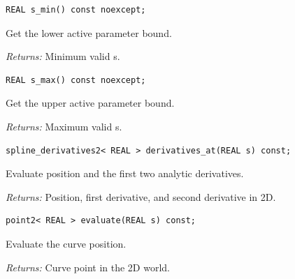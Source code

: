 \par\noindent\begin{minipage}{\linewidth}
\begin{lstlisting}[style=apireference]
REAL s_min() const noexcept;
\end{lstlisting}
{\footnotesize Get the lower active parameter bound.\par}
{\footnotesize\textit{Returns:} Minimum valid s.\par}
\end{minipage}\par\vspace{1pt}
\par\noindent\begin{minipage}{\linewidth}
\begin{lstlisting}[style=apireference]
REAL s_max() const noexcept;
\end{lstlisting}
{\footnotesize Get the upper active parameter bound.\par}
{\footnotesize\textit{Returns:} Maximum valid s.\par}
\end{minipage}\par\vspace{1pt}
\par\noindent\begin{minipage}{\linewidth}
\begin{lstlisting}[style=apireference]
spline_derivatives2< REAL > derivatives_at(REAL s) const;
\end{lstlisting}
{\footnotesize Evaluate position and the first two analytic derivatives.\par}
{\footnotesize\textit{Returns:} Position, first derivative, and second derivative in 2D.\par}
\end{minipage}\par\vspace{1pt}
\par\noindent\begin{minipage}{\linewidth}
\begin{lstlisting}[style=apireference]
point2< REAL > evaluate(REAL s) const;
\end{lstlisting}
{\footnotesize Evaluate the curve position.\par}
{\footnotesize\textit{Returns:} Curve point in the 2D world.\par}
\end{minipage}\par\vspace{1pt}
